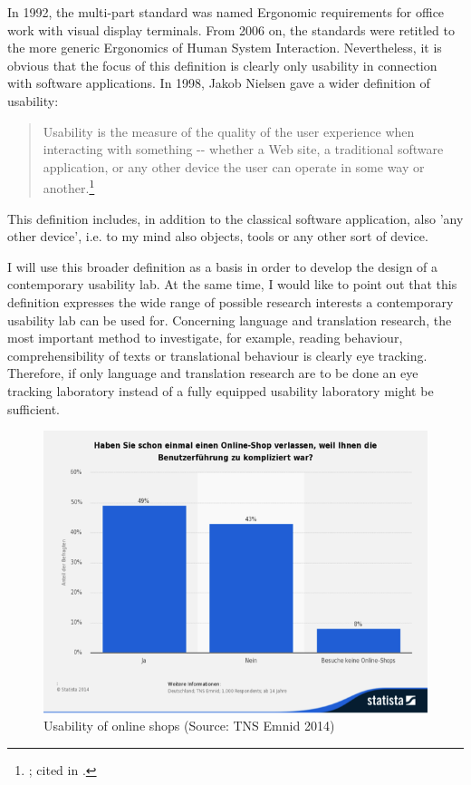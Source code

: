 \documentclass[output=paper]{langsci/langscibook}
\begin{document}
In 1992, the multi-part standard was named {\textquotedbl}Ergonomic requirements for office work with visual display terminals{\textquotedbl}. From 2006 on, the standards were retitled to the more generic {\textquotedbl}Ergonomics of Human System Interaction{\textquotedbl}. Nevertheless, it is obvious that the focus of this definition is clearly only usability in connection with software applications. In 1998, Jakob Nielsen gave a wider definition of usability:

\begin{quote}
{\textquotedbl}Usability is the measure of the quality of the user experience when interacting with something -{}- whether a Web site, a traditional software application, or any other device the user can operate in some way or another.{\textquotedbl}\footnote{ \citet{Nielsen1998}; cited in \citet{Eichinger1999}.}
\end{quote}

This definition includes, in addition to the classical software application, also 'any other device', i.e. to my mind also objects, tools or any other sort of device. 

I will use this broader definition as a basis in order to develop the design of a contemporary usability lab. At the same time, I would like to point out that this definition expresses the wide range of possible research interests a contemporary usability lab can be used for. Concerning language and translation research, the most important method to investigate, for example, reading behaviour, comprehensibility of texts or translational behaviour is clearly eye tracking. Therefore, if only language and translation research are to be done an eye tracking laboratory instead of a fully equipped usability laboratory might be sufficient.

  
\begin{figure}
 \includegraphics[width=\textwidth]{figures/Roesener1.png}
 \caption{Usability of online shops (Source: TNS Emnid 2014)}
 \label{fig:1}
\end{figure} 
 
\end{document}
